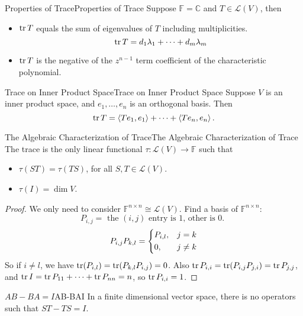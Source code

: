 \documentclass[../main.tex]{subfiles}
\begin{document}
\begin{proposition}{Properties of Trace}{Properties of Trace}
Suppose $\mathbb{F}=\mathbb{C}$ and $T\in \mathscr{L}(V)$, then
\begin{itemize}
\item $\operatorname{tr} T$ equals the sum of eigenvalues of $T$ including multiplicities.
	\begin{equation*}
	\operatorname{tr} T = d_1 \lambda_1 +\cdots +d_m \lambda_m
	\end{equation*}
\item $\operatorname{tr} T$ is the negative of the $z^{n-1}$ term coefficient of the characteristic polynomial.
\end{itemize}
\end{proposition}

\begin{proposition}{Trace on Inner Product Space}{Trace on Inner Product Space}
Suppose $V$ is an inner product space, and $e_1, \ldots ,e_n$ is an orthogonal basis. Then
\begin{equation*}
\operatorname{tr} T = \left<Te_1, e_1\right> +\cdots + \left<Te_n,e_n\right>.
\end{equation*}
\end{proposition}

\begin{theorem}{The Algebraic Characterization of Trace}{The Algebraic Characterization of Trace}
The trace is the only linear functional $\tau: \mathscr{L}(V) \rightarrow \mathbb{F}$ such that
\begin{itemize}
\item $\tau(ST) = \tau(TS)$, for all $S,T\in \mathscr{L}(V)$.
\item $\tau(I)=\dim V$.
\end{itemize}
\end{theorem}
\begin{proof}
We only need to consider $\mathbb{F}^{n \times n} \cong \mathscr{L}(V)$. Find a basis of $\mathbb{F}^{n \times n}$:
\begin{equation*}
P_{i,j} = \text{ the $(i,j)$ entry is $1$, other is $0$. }
\end{equation*}
\begin{equation*}
P_{i,j}P_{k,l}=
\begin{dcases}
	P_{i,l}, &j=k\\
	0, &j\neq k
\end{dcases}
\end{equation*}
So if $i\neq l$, we have $\operatorname{tr}(P_{i,l}) = \operatorname{tr}(P_{k,l}P_{i,j}) = 0$. Also $\operatorname{tr} P_{i,i} = \operatorname{tr} (P_{i,j}P_{j,i}) = \operatorname{tr} P_{j,j}$, and $\operatorname{tr} I = \operatorname{tr} P_{11}+\cdots +\operatorname{tr} P_{nn} = n$, so $\operatorname{tr} P_{i,i}=1$.
\end{proof}

\begin{example}{$AB-BA=I$}{AB-BAI}
In a finite dimensional vector space, there is no operators such that $ST-TS=I$.
\end{example}
\end{document}
